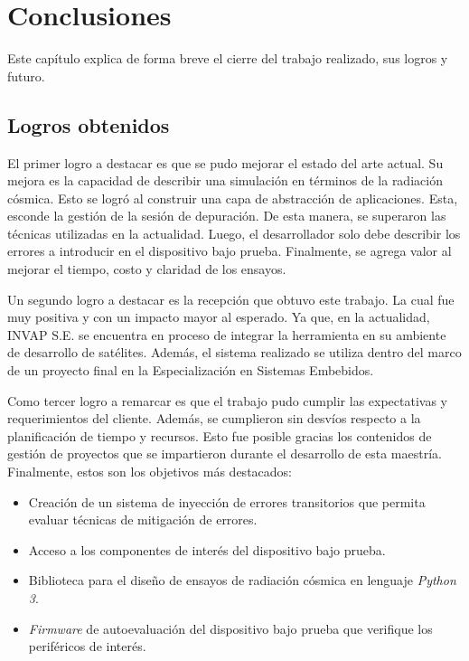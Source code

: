 \chapter{Conclusiones}
\label{Chapter5}

Este capítulo explica de forma breve el cierre del trabajo realizado, sus logros y futuro.

\section{Logros obtenidos}
\label{sec:logros}

El primer logro a destacar es que se pudo mejorar el estado del arte actual.
Su mejora es la capacidad de describir una simulación en términos de la radiación cósmica.
Esto se logró al construir una capa de abstracción de aplicaciones.
Esta, esconde la gestión de la sesión de depuración.
De esta manera, se superaron las técnicas utilizadas en la actualidad.
Luego, el desarrollador solo debe describir los errores a introducir en el dispositivo bajo prueba.
Finalmente, se agrega valor al mejorar el tiempo, costo y claridad de los ensayos.

Un segundo logro a destacar es la recepción que obtuvo este trabajo.
La cual fue muy positiva y con un impacto mayor al esperado.
Ya que, en la actualidad, INVAP S.E. se encuentra en proceso de integrar la herramienta en su ambiente de desarrollo de satélites.
Además, el sistema realizado se utiliza dentro del marco de un proyecto final en la Especialización en Sistemas Embebidos.

Como tercer logro a remarcar es que el trabajo pudo cumplir las expectativas y requerimientos del cliente.
Además, se cumplieron sin desvíos respecto a la planificación de tiempo y recursos.
Esto fue posible gracias los contenidos de gestión de proyectos que se impartieron durante el desarrollo de esta maestría.
Finalmente, estos son los objetivos más destacados:

\begin{itemize}
    \item Creación de un sistema de inyección de errores transitorios que permita evaluar técnicas de mitigación de errores.
    \item Acceso a los componentes de interés del dispositivo bajo prueba.
    \item Biblioteca para el diseño de ensayos de radiación cósmica en lenguaje \emph{Python 3}.
    \item \emph{Firmware} de autoevaluación del dispositivo bajo prueba que verifique los periféricos de interés.
\end{itemize}

